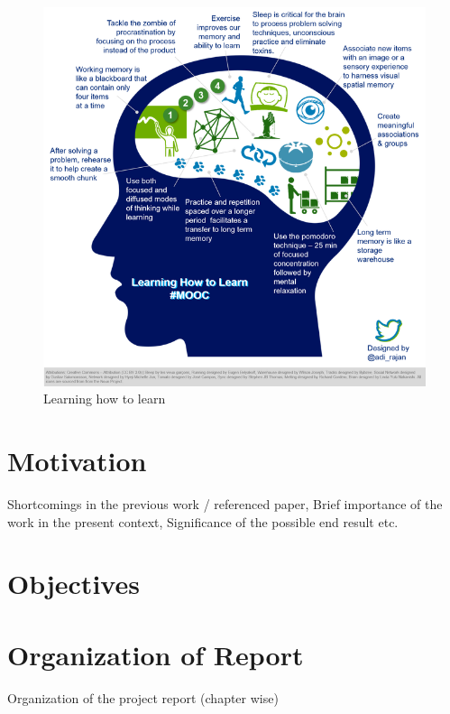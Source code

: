\begin{figure}[bpht]
\includegraphics{Chapter1/LHTL}
\caption{Learning how to learn}
\end{figure}

\section{Motivation}
Shortcomings in the previous work / referenced paper,  Brief importance of the work in the present context,  Significance of the possible end result etc.

\section{Objectives}

\section{Organization of Report}

Organization of the project report (chapter wise)






